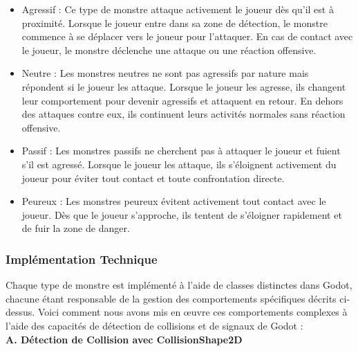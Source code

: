 \begin{itemize}
      \item Agressif :
            Ce type de monstre attaque activement le joueur dès qu'il est à proximité.
            Lorsque le joueur entre dans sa zone de détection, le monstre commence à se déplacer vers le joueur pour l'attaquer.
            En cas de contact avec le joueur, le monstre déclenche une attaque ou une réaction offensive.
            \\

      \item Neutre :
            Les monstres neutres ne sont pas agressifs par nature mais répondent si le joueur les attaque.
            Lorsque le joueur les agresse, ils changent leur comportement pour devenir agressifs et attaquent en retour.
            En dehors des attaques contre eux, ils continuent leurs activités normales sans réaction offensive.
            \\

      \item Passif :
            Les monstres passifs ne cherchent pas à attaquer le joueur et fuient s'il est agressé.
            Lorsque le joueur les attaque, ils s'éloignent activement du joueur pour éviter tout contact et toute confrontation directe.
            \\

      \item Peureux :
            Les monstres peureux évitent activement tout contact avec le joueur.
            Dès que le joueur s'approche, ils tentent de s'éloigner rapidement et de fuir la zone de danger.

\end{itemize}

\subsubsection{Implémentation Technique}

Chaque type de monstre est implémenté à l'aide de classes distinctes dans Godot, chacune étant responsable de la gestion des comportements spécifiques décrits ci-dessus.
Voici comment nous avons mis en œuvre ces comportements complexes à l'aide des capacités de détection de collisions et de signaux de Godot :
\\

\textbf{A. Détection de Collision avec CollisionShape2D}
\vspace*{0.2cm}


